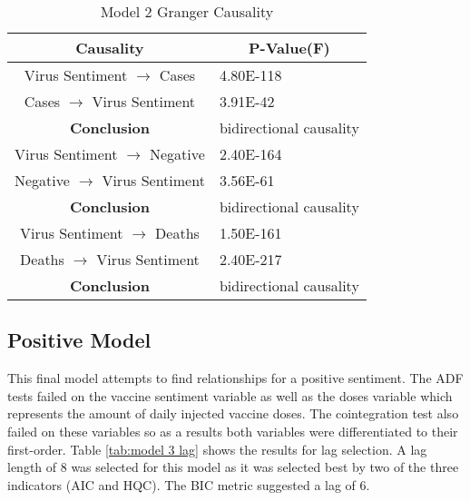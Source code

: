\begin{table}[H]
\centering
\begin{tabular}{@{}cl@{}}
\toprule
\textbf{Causality} & \multicolumn{1}{c}{\textbf{P-Value(F)}} \\ \midrule
Virus Sentiment $\rightarrow$ Cases & 4.80E-118 \\
Cases $\rightarrow$ Virus Sentiment & 3.91E-42 \\
\textbf{Conclusion} & \multicolumn{1}{r}{bidirectional causality} \\
Virus Sentiment $\rightarrow$ Negative & 2.40E-164 \\
Negative $\rightarrow$ Virus Sentiment & 3.56E-61 \\
\textbf{Conclusion} & \multicolumn{1}{r}{bidirectional causality} \\
Virus Sentiment $\rightarrow$ Deaths & 1.50E-161 \\
Deaths $\rightarrow$ Virus Sentiment & 2.40E-217 \\
\textbf{Conclusion} & \multicolumn{1}{r}{bidirectional causality} \\
\bottomrule
\end{tabular}
\caption{Model 2 Granger Causality}
\label{tab:model 2 causality}
\end{table}

\subsection{Positive Model}

This final model attempts to find relationships for a positive sentiment. The ADF tests failed on the vaccine sentiment variable as well as the doses variable which represents the amount of daily injected vaccine doses. The cointegration test also failed on these variables so as a results both variables were differentiated to their first-order. Table \ref{tab:model 3 lag} shows the results for lag selection. A lag length of 8 was selected for this model as it was selected best by two of the three indicators (AIC and HQC). The BIC metric suggested a lag of 6.

